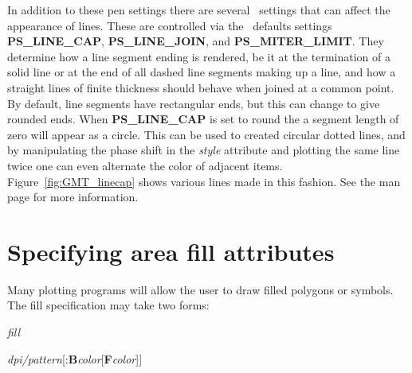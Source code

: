 In addition to these pen settings there are several \PS\ settings that can affect the appearance of lines.
These are controlled via the \GMT\ defaults settings \textbf{PS\_LINE\_CAP}, \textbf{PS\_LINE\_JOIN},
and \textbf{PS\_MITER\_LIMIT}. They determine how a line segment ending is rendered, be it at the
termination of a solid line or at the end of all dashed line segments making up a line, and how a
straight lines of finite thickness should behave when joined at a common point.  By default, line segments
have rectangular ends, but this can change to give rounded ends.  When \textbf{PS\_LINE\_CAP} is set to
round the a segment length of zero will appear as a circle.  This can be used to created circular dotted
lines, and by manipulating the phase shift in the \emph{style} attribute and plotting the same line twice
one can even alternate the color of adjacent items.  Figure~\ref{fig:GMT_linecap} shows various lines made
in this fashion.  See the  man page for more information.

\section{Specifying area fill attributes}

%
%
%
%
%
%
%
\label{sec:fill}

Many plotting programs will allow the user to draw filled polygons or
symbols.  The fill specification may take two forms: 

\vspace{\baselineskip} 

\par {}\emph{fill}\par 

\par {}\emph{dpi/pattern}[:\textbf{B}\emph{color}[\textbf{F}\emph{color}]]\par 

